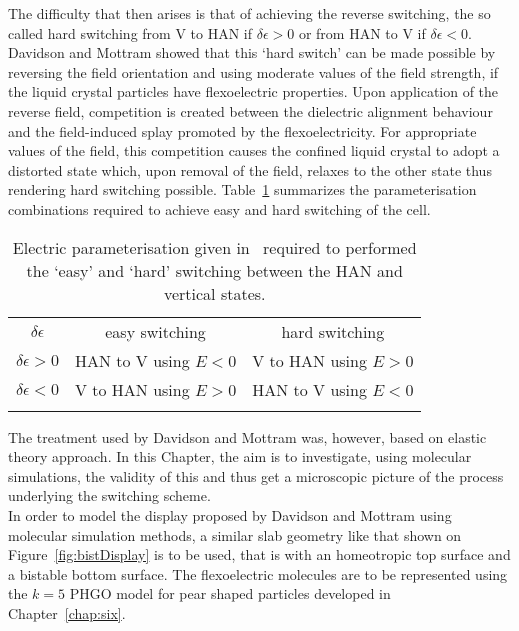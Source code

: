 The difficulty that then arises is that of achieving the reverse switching, the so called hard 
switching from V to HAN if $\delta\epsilon > 0$ or from HAN to V if $\delta\epsilon<0$.
Davidson and Mottram showed that this `hard switch' can be made
possible by reversing the field orientation and using moderate values of the field strength,
if the liquid crystal particles have flexoelectric properties. Upon application of the reverse field,
competition is created between the dielectric alignment behaviour and the  field-induced splay 
promoted by the flexoelectricity. For appropriate values of the field, this competition 
causes the confined liquid crystal to adopt a distorted state 
which, upon removal of the field, relaxes to the other state thus rendering hard switching
possible. Table~\ref{tble:switchPara} summarizes the parameterisation combinations required 
to achieve easy and hard switching of the cell.\\




\begin{table}
	\centering
	\begin{tabular}{||c||c||c||}
	\hhline{|t:=:t:=:t:=:t|}
	$\delta\epsilon$	&easy switching		&hard switching	\\
	\hhline{|:=::=::=:|}
	$\delta\epsilon>0$	&HAN to V using $E < 0$	&V to HAN using $E > 0$	\\
	\hhline{|:=::=::=:|}
	$\delta\epsilon<0$	&V to HAN using $E > 0$	&HAN to V using $E < 0$	\\
	\hhline{|b:=:b:=:b:=:b|}
	\end{tabular}
\caption{Electric parameterisation given in~\cite{DavidsonMottram02} 
required to performed the `easy' and `hard' switching between
the HAN and vertical states.}
\label{tble:switchPara}
\end{table}

The treatment used by Davidson and Mottram was, however, based on elastic theory approach. 
In this Chapter, the aim is to investigate, using molecular simulations, the validity of 
this and thus get a microscopic picture of the process underlying the switching scheme.\\
In order to model the display proposed by Davidson and Mottram using molecular simulation
methods, a similar slab geometry like that shown on Figure~\ref{fig:bistDisplay} is to be 
used, that is with an homeotropic top surface and a bistable 
bottom surface. The flexoelectric molecules are to be represented using the $k=5$ PHGO 
model for pear  shaped particles developed in Chapter~\ref{chap:six}.

